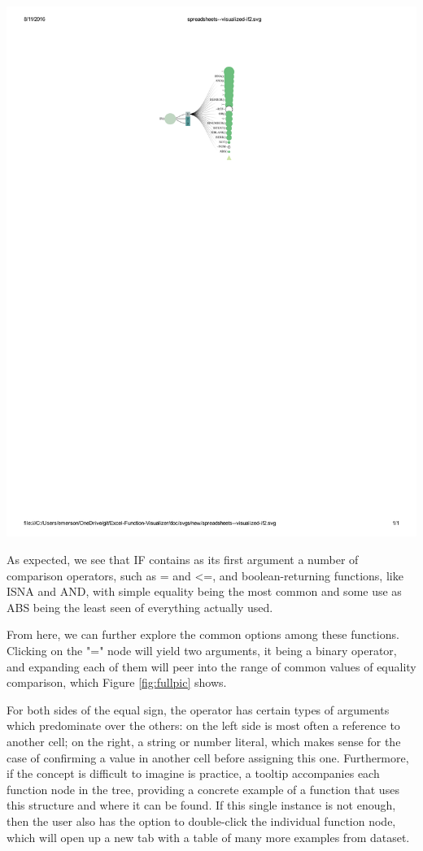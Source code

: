 \documentclass[conference]{IEEEtran}
\begin{document}
	\centerline{\includegraphics[width=.43\textwidth]{IFexpand}}
	
	As expected, we see that IF contains as its first argument a number of
	comparison operators, such as = and <=, and boolean-returning functions, like
	ISNA and AND, with simple equality being the most common and some use as ABS
	being the least seen of everything actually used. \par
	
	From here, we can further explore the common options among these functions.
	Clicking on the "=" node will yield two arguments, it being a binary operator,
	and expanding each of them will peer into the range of common values of
	equality comparison, which Figure \ref{fig:fullpic} shows. \par
	
	For both sides of the equal sign, the operator has certain types of arguments
	which predominate over the others: on the left side is most often a reference
	to another cell; on the right, a string or number literal, which makes sense
	for the case of confirming a value in another cell before assigning this one.
	Furthermore, if the concept is difficult to imagine is practice, a tooltip
	accompanies each function node in the tree, providing a concrete example of a
	function that uses this structure and where it can be found. If this single
	instance is not enough, then the user also has the option to double-click the
	individual function node, which will open up a new tab with a table of many
	more examples from dataset.
	
\end{document}
